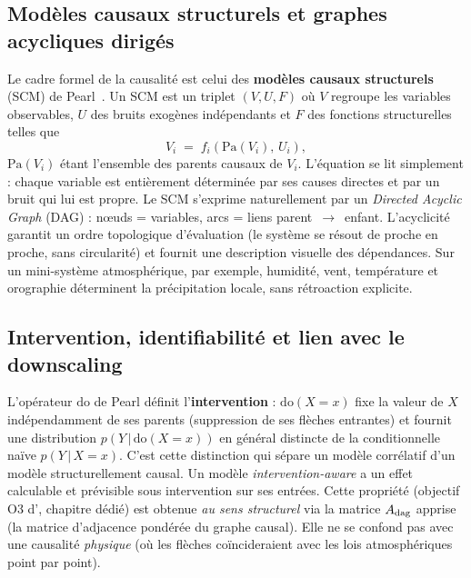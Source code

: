 \subsection{Modèles causaux structurels et graphes acycliques dirigés}
\label{ssec:scm-dag}

Le cadre formel de la causalité est celui des \textbf{modèles causaux structurels} (SCM) de Pearl~\cite{pearl_causality_2009,pearl_book_of_why_2018}. Un SCM est un triplet $(V, U, F)$ où $V$ regroupe les variables observables, $U$ des bruits exogènes indépendants et $F$ des fonctions structurelles telles que
\begin{equation}
  V_i \;=\; f_i\!\left(\mathrm{Pa}(V_i),\, U_i\right),
  \label{eq:scm}
\end{equation}
$\mathrm{Pa}(V_i)$ étant l'ensemble des parents causaux de $V_i$. L'équation se lit simplement : chaque variable est entièrement déterminée par ses causes directes et par un bruit qui lui est propre. Le SCM s'exprime naturellement par un \emph{Directed Acyclic Graph} (DAG) : nœuds = variables, arcs = liens parent~$\to$~enfant. L'acyclicité garantit un ordre topologique d'évaluation (le système se résout de proche en proche, sans circularité) et fournit une description visuelle des dépendances. Sur un mini-système atmosphérique, par exemple, humidité, vent, température et orographie déterminent la précipitation locale, sans rétroaction explicite.

\subsection{Intervention, identifiabilité et lien avec le downscaling}
\label{ssec:intervention}

L'opérateur $\mathrm{do}$ de Pearl définit l'\textbf{intervention} : $\mathrm{do}(X = x)$ fixe la valeur de $X$ indépendamment de ses parents (suppression de ses flèches entrantes) et fournit une distribution $p(Y\,|\,\mathrm{do}(X = x))$ en général distincte de la conditionnelle naïve $p(Y\,|\,X = x)$. C'est cette distinction qui sépare un modèle corrélatif d'un modèle structurellement causal. Un modèle \emph{intervention-aware} a un effet calculable et prévisible sous intervention sur ses entrées. Cette propriété (objectif O3 d'\Oracle{}, chapitre dédié) est obtenue \emph{au sens structurel} via la matrice $A_{\mathrm{dag}}$ apprise (la matrice d'adjacence pondérée du graphe causal). Elle ne se confond pas avec une causalité \emph{physique} (où les flèches coïncideraient avec les lois atmosphériques point par point).

